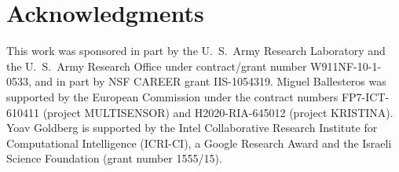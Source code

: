 \documentclass[11pt]{article}
\begin{document}
\section*{Acknowledgments}
 This work was sponsored in part by the U.~S.~Army Research Laboratory and the
 U.~S.~Army Research Office under contract/grant number W911NF-10-1-0533, and in
 part by NSF CAREER grant IIS-1054319. Miguel Ballesteros was supported by the
 European Commission under the contract numbers FP7-ICT-610411 (project
 MULTISENSOR) and H2020-RIA-645012 (project KRISTINA). 
 Yoav Goldberg is supported by the Intel Collaborative Research Institute for
 Computational Intelligence (ICRI-CI), a Google Research Award and the Israeli Science Foundation
 (grant number 1555/15).



\end{document}
